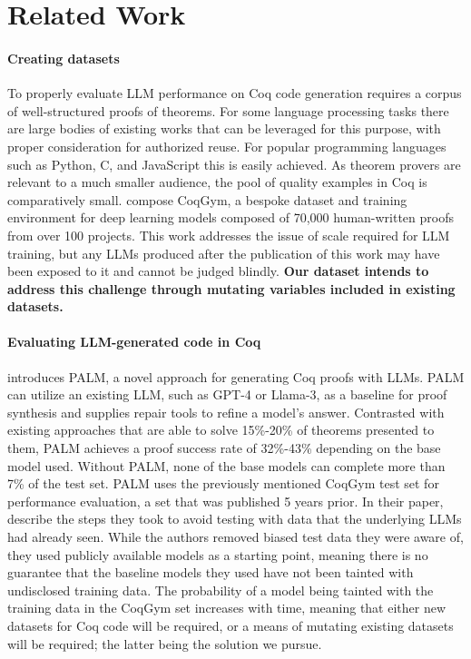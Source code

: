 
\section{Related Work}
\label{sec:related-work}


\paragraph{Creating datasets}
To properly evaluate LLM performance on
Coq code generation requires a corpus of well-structured
proofs of theorems. For some language processing tasks
there are large bodies of existing works that can be leveraged for this purpose, 
with proper consideration for authorized reuse.
For popular programming
languages such as Python, C, and JavaScript this is easily achieved.
As theorem provers are relevant to a much smaller audience, the pool of quality examples in Coq is
comparatively small.
\citet{learningtoprove} compose CoqGym,
a bespoke dataset and training environment for deep learning models
composed of 70,000 human-written proofs from over 100 projects.
This work addresses the issue of scale required for LLM training,
but any LLMs produced
after the publication of this work
may have been exposed to it and cannot be judged blindly.
\textbf{Our dataset intends to address this challenge through mutating variables included in existing datasets.}

\paragraph{Evaluating LLM-generated code in Coq}

\citep{proofautomationwithllms} introduces PALM,
a novel approach for generating Coq proofs with LLMs.
PALM can utilize an existing LLM, such as GPT-4 or Llama-3,
as a baseline for proof synthesis and supplies repair tools
to refine a model's answer.
Contrasted with existing approaches that are able
to solve 15\%-20\% of theorems presented to them,
PALM achieves a proof success rate of 32\%-43\% 
depending on the base model used.
Without PALM, none of the base models can
complete more than 7\% of the test set.
PALM uses the previously mentioned CoqGym test set
for performance evaluation, 
a set that was published 5 years prior. 
In their paper, \citeauthor{proofautomationwithllms} describe the steps 
they took to avoid testing with data 
that the underlying LLMs had already seen.  
While the authors removed biased test data they were aware of, 
they used publicly available models as a starting point, 
meaning there is no guarantee that the baseline models 
they used have not been tainted with undisclosed training data. 
The probability of a model being tainted 
with the training data in the CoqGym set increases with time, 
meaning that either new datasets for Coq code will be required, 
or a means of mutating existing datasets will be required; 
the latter being the solution we pursue.


